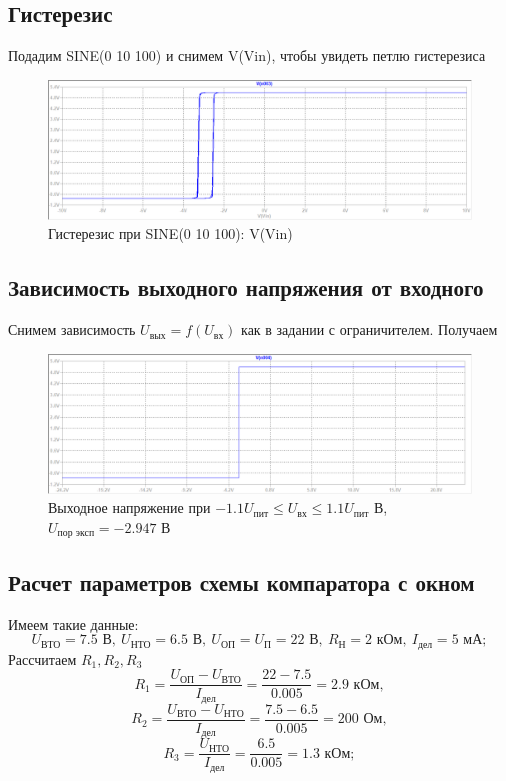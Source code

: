 \documentclass[a4paper, 12pt]{article}
\begin{document}
    \subsection{Гистерезис}
    Подадим SINE(0 10 100) и снимем V(Vin), чтобы увидеть петлю гистерезиса
    \begin{figure}[H]
        \centering
        \includegraphics[scale=0.46]{hystesis2.png}
        \captionsetup{skip=0pt}
        \caption{Гистерезис при SINE(0 10 100): V(Vin)}
        \label{fig:hystesis2}
    \end{figure}


    \subsection{Зависимость выходного напряжения от входного}
    Снимем зависимость $U_\text{вых}=f\left( U_\text{вх} \right)$ как в задании с ограничителем.
    Получаем
    \begin{figure}[H]
        \centering
        \includegraphics[scale=0.46]{7task_fuin.png}
        \captionsetup{skip=0pt}
        \caption{Выходное напряжение при $-1.1U_\text{пит}\leq U_\text{вх}\leq 1.1U_\text{пит}$ В, $U_\text{пор эксп}=-2.947$ В}
        \label{fig:7task_fuin}
    \end{figure}


    \subsection{Расчет параметров схемы компаратора с окном}
    Имеем такие данные:
    $$
    U_\text{ВТО}=7.5\text{ В},\ U_\text{НТО}=6.5\text{ В},\ U_\text{ОП}=U_\text{П}=22\text{ В},\ R_\text{Н}=2\text{ кОм},\ I_\text{дел}=5\text{ мА};
    $$
    Рассчитаем $R_1,R_2,R_3$
    $$
    R_1=\dfrac{U_\text{ОП}-U_\text{ВТО}}{I_\text{дел}}=\dfrac{22-7.5}{0.005}=2.9\text{ кОм},
    $$
    $$
    R_2=\dfrac{U_\text{ВТО}-U_\text{НТО}}{I_\text{дел}}=\dfrac{7.5-6.5}{0.005}=200\text{ Ом},
    $$
    $$
    R_3=\dfrac{U_\text{НТО}}{I_\text{дел}}=\dfrac{6.5}{0.005}=1.3\text{ кОм};
    $$
\end{document}

